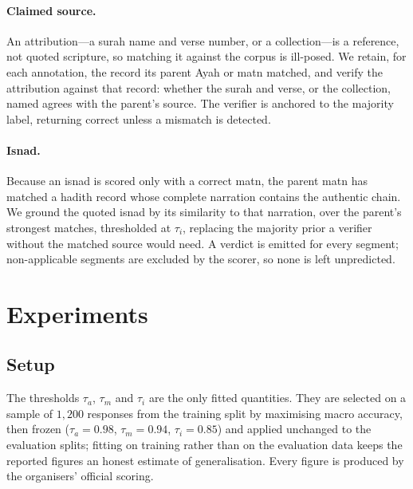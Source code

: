 \documentclass[11pt]{article}
\begin{document}
\paragraph{Claimed source.} An attribution---a surah name and verse number, or a collection---is a
reference, not quoted scripture, so matching it against the corpus is ill-posed. We retain, for each
annotation, the record its parent Ayah or matn matched, and verify the attribution against that
record: whether the surah and verse, or the collection, named agrees with the parent's source. The
verifier is anchored to the majority label, returning correct unless a mismatch is detected.

\paragraph{Isnad.}
\label{sec:isnad}
Because an isnad is scored only with a correct matn, the parent matn has matched a hadith record whose
complete narration contains the authentic chain. We ground the quoted isnad by its similarity to that
narration, over the parent's strongest matches, thresholded at $\tau_i$, replacing the majority prior
a verifier without the matched source would need. A verdict is emitted for every segment;
non-applicable segments are excluded by the scorer, so none is left unpredicted.

\section{Experiments}
\label{sec:experiments}

\subsection{Setup}
The thresholds $\tau_a$, $\tau_m$ and $\tau_i$ are the only fitted quantities. They are selected on a
sample of $1{,}200$ responses from the training split by maximising macro accuracy, then frozen
($\tau_a=0.98$, $\tau_m=0.94$, $\tau_i=0.85$) and applied unchanged to the evaluation splits; fitting
on training rather than on the evaluation data keeps the reported figures an honest estimate of
generalisation. Every figure is produced by the organisers' official scoring.
\end{document}
